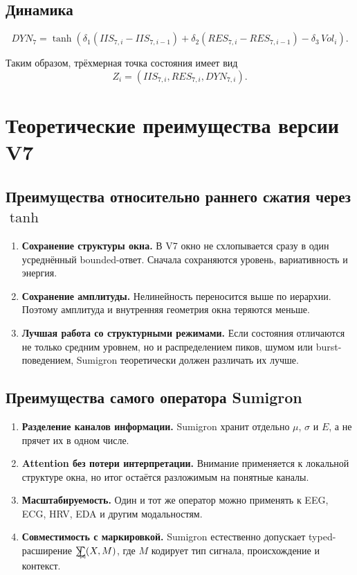\documentclass[12pt,a4paper]{article}
\newcommand{\sgsumintright}[1]{\mathop{\mathchoice
  {\ooalign{
    \hfil$\displaystyle\sum$\hfil\cr
    \hfil$\displaystyle\int$\hfil\cr
    \hidewidth\raisebox{-1.35ex}{\kern1.25ex$\scriptstyle #1$}\hidewidth\cr
  }}
  {\ooalign{
    \hfil$\textstyle\sum$\hfil\cr
    \hfil$\textstyle\int$\hfil\cr
    \hidewidth\raisebox{-1.00ex}{\kern1.00ex$\scriptscriptstyle #1$}\hidewidth\cr
  }}
  {\ooalign{
    \hfil$\scriptstyle\sum$\hfil\cr
    \hfil$\scriptstyle\int$\hfil\cr
    \hidewidth\raisebox{-0.75ex}{\kern0.75ex$\scriptscriptstyle #1$}\hidewidth\cr
  }}
  {\ooalign{
    \hfil$\scriptscriptstyle\sum$\hfil\cr
    \hfil$\scriptscriptstyle\int$\hfil\cr
    \hidewidth\raisebox{-0.60ex}{\kern0.55ex$\scriptscriptstyle #1$}\hidewidth\cr
  }}
}}
\newcommand{\sgop}{\sgsumintright{\bowtie}}
\begin{document}
\subsection{Динамика}
\[
DYN_7=
\tanh\!\left(
\delta_1(IIS_{7,i}-IIS_{7,i-1})
+\delta_2(RES_{7,i}-RES_{7,i-1})
-\delta_3\,Vol_i
\right).
\]

Таким образом, трёхмерная точка состояния имеет вид
\[
Z_i=(IIS_{7,i},RES_{7,i},DYN_{7,i}).
\]

\section{Теоретические преимущества версии V7}
\subsection{Преимущества относительно раннего сжатия через \texorpdfstring{\( \tanh \)}{tanh}}
\begin{enumerate}[leftmargin=1.25cm]
    \item \textbf{Сохранение структуры окна.} В V7 окно не схлопывается сразу в один усреднённый bounded-ответ. Сначала сохраняются уровень, вариативность и энергия.
    \item \textbf{Сохранение амплитуды.} Нелинейность переносится выше по иерархии. Поэтому амплитуда и внутренняя геометрия окна теряются меньше.
    \item \textbf{Лучшая работа со структурными режимами.} Если состояния отличаются не только средним уровнем, но и распределением пиков, шумом или burst-поведением, Sumigron теоретически должен различать их лучше.
\end{enumerate}

\subsection{Преимущества самого оператора Sumigron}
\begin{enumerate}[leftmargin=1.25cm]
    \item \textbf{Разделение каналов информации.} Sumigron хранит отдельно \(\mu\), \(\sigma\) и \(E\), а не прячет их в одном числе.
    \item \textbf{Attention без потери интерпретации.} Внимание применяется к локальной структуре окна, но итог остаётся разложимым на понятные каналы.
    \item \textbf{Масштабируемость.} Один и тот же оператор можно применять к EEG, ECG, HRV, EDA и другим модальностям.
    \item \textbf{Совместимость с маркировкой.} Sumigron естественно допускает typed-расширение \(\sgop(X,M)\), где \(M\) кодирует тип сигнала, происхождение и контекст.
\end{enumerate}
\end{document}
